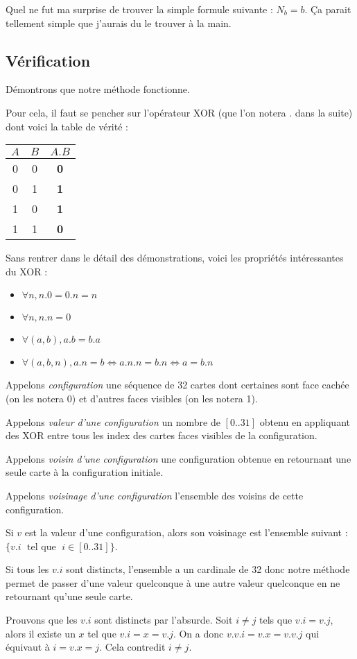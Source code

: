 \documentclass[10pt,a4paper,onecolumn]{article}
\begin{document}
Quel ne fut ma surprise de trouver la simple formule suivante : $N_b = b$. Ça parait tellement simple que j'aurais du le trouver à la main.

\subsection{Vérification}
Démontrons que notre méthode fonctionne.

Pour cela, il faut se pencher sur l'opérateur XOR (que l'on notera $.$ dans la suite) dont voici la table de vérité :

\begin{tabular}{|c|c|c|}
\hline
$A$ & $B$ & $A.B$ \\\hline
0 & 0 & \bf 0 \\\hline
0 & 1 & \bf 1 \\\hline
1 & 0 & \bf 1 \\\hline
1 & 1 & \bf 0 \\\hline
\end{tabular}

Sans rentrer dans le détail des démonstrations, voici les propriétés intéressantes du XOR :
\begin{itemize}
\item $\forall n, n.0 = 0.n = n$
\item $\forall n, n.n = 0$
\item $\forall (a,b), a.b = b.a$
\item $\forall (a,b,n), a.n = b \iff a.n.n = b.n \iff a = b.n$
\end{itemize}


Appelons \emph{configuration} une séquence de 32 cartes dont certaines sont face cachée (on les notera 0) et d'autres faces visibles (on les notera 1).

Appelons \emph{valeur d'une configuration} un nombre de $[0..31]$ obtenu en appliquant des XOR entre tous les index des cartes faces visibles de la configuration.

Appelons \emph{voisin d'une configuration} une configuration obtenue en retournant une seule carte à la configuration initiale.

Appelons \emph{voisinage d'une configuration} l'ensemble des voisins de cette configuration.

Si $v$ est la valeur d'une configuration, alors son voisinage est l'ensemble suivant :
$\{v.i \;\text{ tel que }\; i\in [0..31]\}$.

Si tous les $v.i$ sont distincts, l'ensemble a un cardinale de 32 donc notre méthode permet de passer d'une valeur quelconque à une autre valeur quelconque en ne retournant qu'une seule carte.

Prouvons que les $v.i$ sont distincts par l'absurde. Soit $i\neq j$ tels que $v.i = v.j$, alors il existe un $x$ tel que $v.i = x = v.j$. On a donc $v.v.i = v.x = v.v.j$ qui équivaut à $i = v.x = j$. Cela contredit $i\neq j$.
\end{document}
